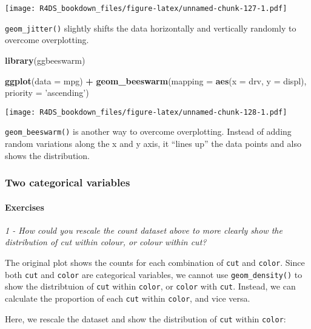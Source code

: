 \documentclass[]{article}
\newenvironment{Shaded}{\begin{snugshade}}{\end{snugshade}}
\newcommand{\KeywordTok}[1]{\textcolor[rgb]{0.13,0.29,0.53}{\textbf{#1}}}
\newcommand{\DataTypeTok}[1]{\textcolor[rgb]{0.13,0.29,0.53}{#1}}
\newcommand{\StringTok}[1]{\textcolor[rgb]{0.31,0.60,0.02}{#1}}
\newcommand{\OperatorTok}[1]{\textcolor[rgb]{0.81,0.36,0.00}{\textbf{#1}}}
\newcommand{\NormalTok}[1]{#1}
\let\oldparagraph\paragraph
\renewcommand{\paragraph}[1]{\oldparagraph{#1}\mbox{}}
\theoremstyle{definition}
\theoremstyle{definition}
\theoremstyle{definition}
\theoremstyle{remark}
\begin{document}
\texttt{[image: R4DS\_bookdown\_files/figure-latex/unnamed-chunk-127-1.pdf]}

\texttt{geom\_jitter()} slightly shifts the data horizontally and
vertically randomly to overcome overplotting.

\begin{Shaded}
\begin{Highlighting}[]
\KeywordTok{library}\NormalTok{(ggbeeswarm)}

\KeywordTok{ggplot}\NormalTok{(}\DataTypeTok{data =}\NormalTok{ mpg) }\OperatorTok{+}\StringTok{ }
\StringTok{  }\KeywordTok{geom_beeswarm}\NormalTok{(}\DataTypeTok{mapping =} \KeywordTok{aes}\NormalTok{(}\DataTypeTok{x =}\NormalTok{ drv, }\DataTypeTok{y =}\NormalTok{ displ), }\DataTypeTok{priority =} \StringTok{'ascending'}\NormalTok{)}
\end{Highlighting}
\end{Shaded}

\texttt{[image: R4DS\_bookdown\_files/figure-latex/unnamed-chunk-128-1.pdf]}

\texttt{geom\_beeswarm()} is another way to overcome overplotting.
Instead of adding random variations along the x and y axis, it ``lines
up'' the data points and also shows the distribution.

\subsubsection{Two categorical
variables}\label{two-categorical-variables}

\paragraph{Exercises}\label{exercises-16}

\emph{1 - How could you rescale the count dataset above to more clearly
show the distribution of cut within colour, or colour within cut?}

The original plot shows the counts for each combination of \texttt{cut}
and \texttt{color}. Since both \texttt{cut} and \texttt{color} are
categorical variables, we cannot use \texttt{geom\_density()} to show
the distribtuion of \texttt{cut} within \texttt{color}, or
\texttt{color} with \texttt{cut}. Instead, we can calculate the
proportion of each \texttt{cut} within \texttt{color}, and vice versa.

Here, we rescale the dataset and show the distribution of \texttt{cut}
within \texttt{color}:
\end{document}
